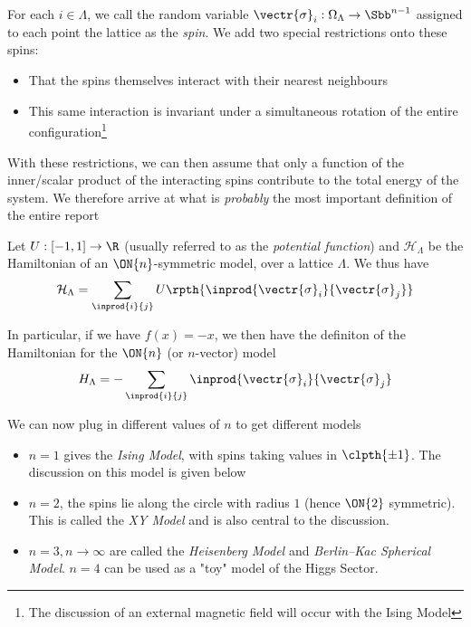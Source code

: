 	For each $i \in \Lambda$, we call the random variable $\vectr{\sigma}_i: \Omega_{\Lambda} 
	\rightarrow \Sbb^{n-1}$ assigned to each point the lattice as the \textit{spin}. We add two special
	restrictions onto these spins: 
	\begin{itemize}
		\item That the spins themselves interact with their nearest neighbours
		\item This same interaction is invariant under a simultaneous rotation of the 
			entire configuration\footnote{The discussion of an external magnetic field will occur with 
			the Ising Model}
	\end{itemize}
	With these restrictions, we can then assume that only a function of the inner/scalar product of the 
	interacting spins contribute to the total energy of the system. We therefore arrive at what is 
	\textit{probably} the most important definition of the entire report

	\begin{ndefi}
		Let $U: [-1,1] \rightarrow \R$ (usually referred to as the \textit {potential function}) 
		and $\mathcal{H}_{\Lambda}$ be the Hamiltonian of an $\ON{n}$-symmetric model, over a lattice 
		$\Lambda$. We thus have
		\begin{equation}
			\mathcal{H}_{\Lambda} = \sum_{\inprod{i}{j}} U\rpth{\inprod{\vectr{\sigma}_i}
			{\vectr{\sigma}_j}}
		\end{equation}

		In particular, if we have $f(x) = -x$, we then have the definiton of the Hamiltonian for 
		the $\ON{n}$ (or $n$-vector) model
		\begin{equation}
		H_{\Lambda} = - \sum_{\inprod{i}{j}} \inprod{\vectr{\sigma}_i}{\vectr{\sigma}_j}
		\end{equation}
	\end{ndefi}

	We can now plug in different values of $n$ to get different models 
	\begin{itemize}
		\item $n=1$ gives the \textit{Ising Model}, with spins taking values in $\clpth{\pm1}$. The 
			discussion on this model is given below
		\item $n=2$, the spins lie along the circle with radius $1$ (hence $\ON{2}$ symmetric). This
			is called the \textit{XY Model} and is also central to the discussion. 
		\item $n=3, n \rightarrow \infty$ are called the \textit{Heisenberg Model} and 
			\textit{Berlin–Kac Spherical Model}. $n=4$ can be used as a "toy" model of the Higgs Sector.
	\end{itemize}

